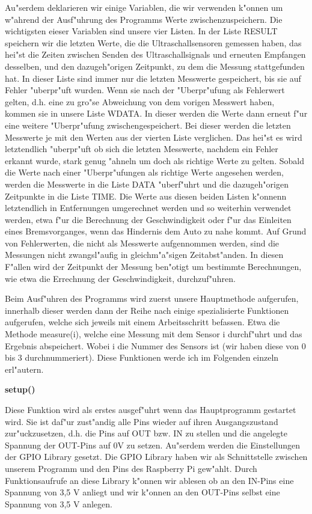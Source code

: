 \documentclass[a4paper,12pt]{article}
\begin{document}
Au"serdem deklarieren wir einige Variablen, die wir verwenden k"onnen um w"ahrend der Ausf"uhrung des Programms Werte zwischenzuspeichern.
Die wichtigsten eieser Variablen sind unsere vier Listen.
In der Liste RESULT speichern wir die letzten Werte, die die Ultraschallsensoren gemessen haben, das hei"st die Zeiten zwischen Senden des Ultraschallsignals und erneuten Empfangen desselben, und den dazugeh"origen Zeitpunkt, zu dem die Messung stattgefunden hat.
In dieser Liste sind immer nur die letzten Messwerte gespeichert, bis sie auf Fehler "uberpr"uft wurden.
Wenn sie nach der "Uberpr"ufung als Fehlerwert gelten, d.h. eine zu gro"se Abweichung von dem vorigen Messwert haben, kommen sie in unsere Liste WDATA.
In dieser werden die Werte dann erneut f"ur eine weitere "Uberpr"ufung zwischengespeichert.
Bei dieser werden die letzten Messwerte je mit den Werten aus der vierten Liste verglichen.
Das hei"st es wird letztendlich "uberpr"uft ob sich die letzten Messwerte, nachdem ein Fehler erkannt wurde, stark genug "ahneln um doch als richtige Werte zu gelten.
Sobald die Werte nach einer "Uberpr"ufungen als richtige Werte angesehen werden, werden die Messwerte in die Liste DATA "uberf"uhrt und die dazugeh"origen Zeitpunkte in die Liste TIME.
Die Werte aus diesen beiden Listen k"onnenn letztendlich in Entfernungen umgerechnet werden und so weiterhin verwendet werden, etwa f"ur die Berechnung der Geschwindigkeit oder f"ur das Einleiten eines Bremsvorganges, wenn das Hindernis dem Auto zu nahe kommt.
Auf Grund von Fehlerwerten, die nicht als Messwerte aufgennommen werden, sind die Messungen nicht zwangsl"aufig in gleichm"a"sigen Zeitabst"anden. In diesen F"allen wird der Zeitpunkt der Messung ben"otigt um bestimmte Berechnungen, wie etwa die Errechnung der Geschwindigkeit, durchzuf"uhren.

\medskip

Beim Ausf"uhren des Programms wird zuerst unsere Hauptmethode aufgerufen, innerhalb dieser werden dann der Reihe nach einige spezialisierte Funktionen aufgerufen, welche sich jeweils mit einem Arbeitsschritt befassen.
Etwa die Methode measure(i), welche eine Messung mit dem Sensor i durchf"uhrt und das Ergebnis abspeichert.
Wobei i die Nummer des Sensors ist (wir haben diese von 0 bis 3 durchnummeriert).
Diese Funktionen werde ich im Folgenden einzeln erl"autern.

\medskip

\textbf{setup()}

Diese Funktion wird als erstes ausgef"uhrt wenn das Hauptprogramm gestartet wird.
Sie ist daf"ur zust"andig alle Pins wieder auf ihren Ausgangszustand zur"uckzusetzen, d.h. die Pins auf OUT bzw. IN zu stellen und die angelegte Spannung der OUT-Pins auf 0V zu setzen.
Au"serdem werden die Einstellungen der GPIO Library gesetzt.
Die GPIO Library haben wir als Schnittstelle zwischen unserem Programm und den Pins des Raspberry Pi gew"ahlt.
Durch Funktionsaufrufe an diese Library k"onnen wir ablesen ob an den IN-Pins eine Spannung von 3,5 V anliegt und wir k"onnen an den OUT-Pins selbst eine Spannung von 3,5 V anlegen.
\end{document}
